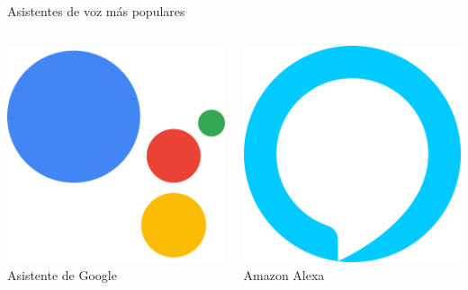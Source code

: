 \documentclass{beamer}
\begin{document}
  \begin{frame}[c]{Asistentes de voz más populares}
    \vspace{1em}
    \begin{columns}[c]
      \begin{column}{.5\textwidth}
        \centering
        \hyperlink{asistente-google}{\includegraphics[scale=.207]{asistente-google-logo.png}}\\
        Asistente de Google
      \end{column}
      \begin{column}{.5\textwidth}
        \centering
        \hyperlink{amazon-alexa}{\includegraphics[scale=4.3]{amazon-alexa.png}}\\
        Amazon Alexa
      \end{column}
    \end{columns}


\end{frame}
\end{document}
